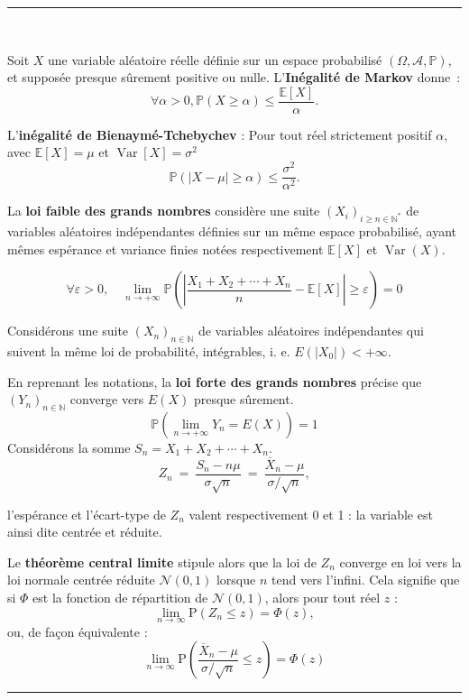 \hrule
\begin{f} {\ }
	
	Soit \(X\) une variable aléatoire réelle définie sur un espace probabilisé \(\left(\Omega,\mathcal A,\mathbb P\right)\), et supposée presque sûrement positive ou nulle. L'\textbf{Inégalité de Markov} donne~:
	\[
	\forall \alpha >0, \mathbb P(X\geq \alpha)\leqslant\frac{\mathbb{E}[X]}{\alpha}.
	\]
	
	L'\textbf{inégalité de Bienaymé-Tchebychev} : 
	Pour tout réel strictement positif \(\alpha\), avec \(\mathbb{E}[X]=\mu\) et \(\operatorname{Var}[X]=\sigma^2\)
	\[
	\mathbb{P}\left(\left|X-\mu\right| \geq \alpha \right) \leq \frac{\sigma^2}{\alpha^2}.
	\]
	
	La \textbf{loi faible des grands nombres} considère une suite \((X_i)_{i\geq n\in\mathbb{N}^*}\) de variables aléatoires indépendantes définies sur un même espace probabilisé, ayant mêmes espérance et  variance finies notées respectivement \(\mathbb{E}[X]\) et \(\operatorname{Var}(X)\).
	
	\[
	\forall\varepsilon>0,\quad \lim_{n \to +\infty} \mathbb{P}\left(\left|\frac{X_1+X_2+\cdots+X_n}{n} - \mathbb{E}[X]\right| \geq \varepsilon\right) = 0
	\]
	
	Considérons une suite \((X_n)_{n\in \mathbb{N}}\) de variables aléatoires indépendantes qui suivent la même loi de probabilité, intégrables, i. e. \(E(|X_0|)<+\infty\). 
	
	En reprenant les notations, la \textbf{loi forte des grands nombres} précise que \((Y_n)_{n\in\mathbb{N}}\) converge vers \(E(X)\) \og{} presque sûrement\fg{}.
	\[
	\mathbb{P}\left(\lim_{n \to +\infty} Y_n = E(X)\right)=1
	\]
	Considérons la somme \(S_n = X_1 + X_2 + \cdots + X_n\).
	\[   
	Z_n\ =\ \frac{S_n - n \mu}{\sigma \sqrt{n}}\ =\ \frac{\overline{X}_n-\mu}{\sigma/\sqrt{n}},
	\]
	
	l'espérance et l'écart-type de \(Z_n\) valent respectivement 0 et 1 : la variable est ainsi dite centrée et réduite.
	
	Le \textbf{théorème central limite} stipule alors que la loi de \(Z_n\) converge en loi vers la loi normale centrée réduite \(\mathcal{N} (0 , 1)\) lorsque \(n\) tend vers l'infini. Cela signifie que si \(\Phi\) est la fonction de répartition de \(\mathcal{N} (0 , 1)\), alors pour tout réel \(z\) :
	\[
	\lim_{n \to \infty} \mbox{P}(Z_n \le z) = \Phi(z),
	\]
	ou, de façon équivalente :
	\[
	\lim_{n\to\infty}\mbox{P}\left(\frac{\overline{X}_n-\mu}{\sigma/\sqrt{n}}\leq z\right)=\Phi(z)
	\]
\end{f}
\hrule

